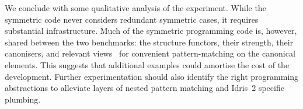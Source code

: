 We conclude with some qualitative analysis of the experiment. While
the symmetric code never considers redundant symmetric cases, it
requires substantial infrastructure. Much of the symmetric programming
code is, however, shared between the two benchmarks: the structure
functors, their strength, their canonisers, and relevant
\citeauthor{mcbride-mckinna:views} views~\cite{mcbride-mckinna:views}
for convenient pattern-matching on the canonical elements. This
suggests that additional examples could amortise the cost of the
development. Further experimentation should also identify the right
programming abstractions to alleviate layers of nested pattern
matching and Idris~2 specific plumbing.
